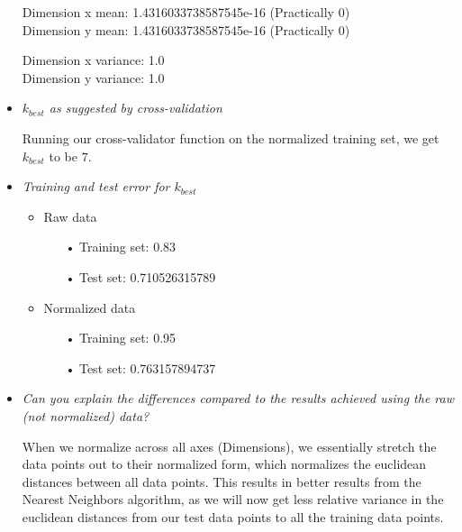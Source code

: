 \documentclass[12pt, a4paper]{article}
\begin{document}
\begin{itemize}
Dimension x mean: 1.4316033738587545e-16 (Practically 0) \\
Dimension y mean: 1.4316033738587545e-16 (Practically 0)

Dimension x variance: 1.0 \\
Dimension y variance: 1.0

\item \textit{$k_{best}$ as suggested by cross-validation}

Running our cross-validator function on the normalized training set, we get $k_{best}$ to be $7$.

\item \textit{Training and test error for $k_{best}$}

\begin{itemize}
	\item Raw data
	\begin{itemize}
		\item[•] Training set: 0.83
		\item[•] Test set: 0.710526315789
	\end{itemize}

	\item Normalized data
	\begin{itemize}
		\item[•] Training set: 0.95
		\item[•] Test set: 0.763157894737
	\end{itemize}
\end{itemize}

\item \textit{Can you explain the differences compared to the results achieved using the raw (not normalized) data?}

When we normalize across all axes (Dimensions), we essentially stretch the data points out to their normalized form, which normalizes the euclidean distances between all data points. This results in better results from the Nearest Neighbors algorithm, as we will now get less relative variance in the euclidean distances from our test data points to all the training data points.

\end{itemize}
\end{document}
